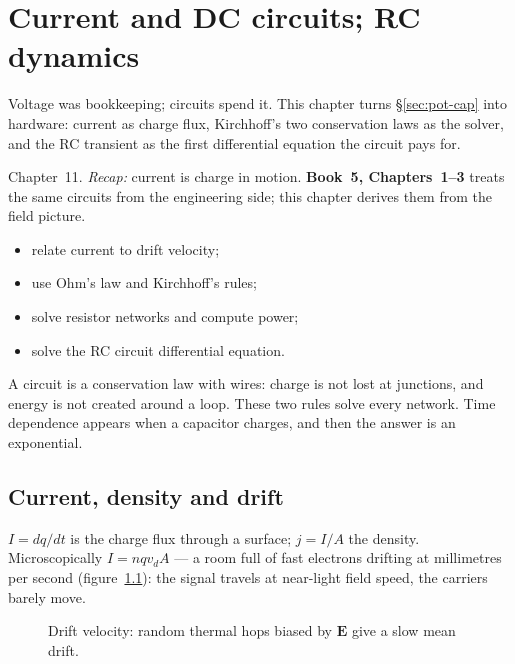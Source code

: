 \chapter{Current and DC circuits; RC dynamics}\label{ch:circ}

Voltage was bookkeeping; circuits spend it. This chapter turns
\S\ref{sec:pot-cap} into hardware: current as charge flux, Kirchhoff's
two conservation laws as the solver, and the RC transient as the first
differential equation the circuit pays for.

\begin{rulebox}
Chapter~11. \emph{Recap:} current is charge in motion. \textbf{Book~5, Chapters~1--3} treats the same circuits from the engineering side; this chapter derives them from the field picture.
\end{rulebox}
\begin{wins}
\begin{itemize}
\item relate current to drift velocity;
\item use Ohm's law and Kirchhoff's rules;
\item solve resistor networks and compute power;
\item solve the RC circuit differential equation.
\end{itemize}
\end{wins}
\begin{principle}
A circuit is a conservation law with wires: charge is not lost at junctions, and energy is not created around a loop. These two rules solve every network. Time dependence appears when a capacitor charges, and then the answer is an exponential.
\end{principle}

\section{Current, density and drift}\label{sec:cir-current}

$I=dq/dt$ is the charge flux through a surface; $j=I/A$ the density.
Microscopically $I=nqv_dA$ --- a room full of fast electrons drifting
at millimetres per second (figure~\ref{fig:drift}): the signal travels
at near-light field speed, the carriers barely move.

\begin{figure}[htbp]\centering

\caption{Drift velocity: random thermal hops biased by $\mathbf E$
give a slow mean drift.}
\label{fig:drift}
\end{figure}

